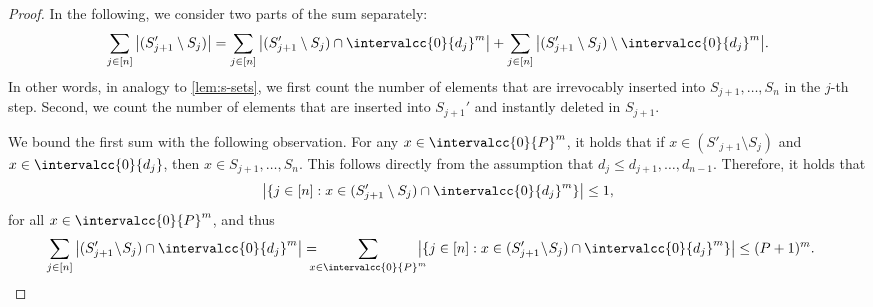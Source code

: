 \documentclass[10pt,a4paper]{article}
\DeclarePairedDelimiter\set{\lbrace}{\rbrace}
\begin{document}
\begin{proof}
    In the following, we consider two parts of the sum separately:
    \[
        \sum_{j\in[n]} \big|(S'_{j+1} \setminus S_{j})\big| = \sum_{j\in[n]} \big|(S'_{j+1} \setminus S_{j}) \cap \intervalcc{0}{d_{j}}^m\big| + \sum_{j\in[n]} \big|(S'_{j+1} \setminus S_{j}) \setminus \intervalcc{0}{d_{j}}^m\big|.
    \]
    In other words, in analogy to \cref{lem:s-sets}, we first count the number of elements that are irrevocably inserted into $S_{j+1}, \dots, S_n$ in the $j$-th step.
    Second, we count the number of elements that are inserted into $S_{j+1}'$ and instantly deleted in $S_{j+1}$.

    We bound the first sum with the following observation.
    For any $x \in \intervalcc{0}{P}^m$, it holds that if $x \in (S'_{j+1} \setminus S_{j})$ and $x \in \intervalcc{0}{d_j}$, then $x \in S_{j+1}, \dots, S_n$. 
    This follows directly from the assumption that $d_j \le d_{j+1}, \dots ,d_{n-1}$.
    Therefore, it holds that
    \[
        \big|\set{ j \in [n] : x \in (S'_{j+1} \setminus S_{j}) \cap \intervalcc{0}{d_j}^m}\big|  \le 1,
    \]
    for all $x \in \intervalcc{0}{P}^m$, and thus
    \begin{align*}
        \sum_{j\in[n]} \big|(S'_{j+1} \!\setminus\! S_{j}) \cap \intervalcc{0}{d_j}^m \big| 
        &= \!\!\!\!\!\sum_{x\in\intervalcc{0}{P}^m}\!\!\!\!\! \big|\set{ j \in [n] : x \in (S'_{j+1} \!\setminus\! S_{j}) \cap \intervalcc{0}{d_j}^m}\big| \le (P + 1)^m.
    \end{align*}   


\end{proof}
\end{document}
